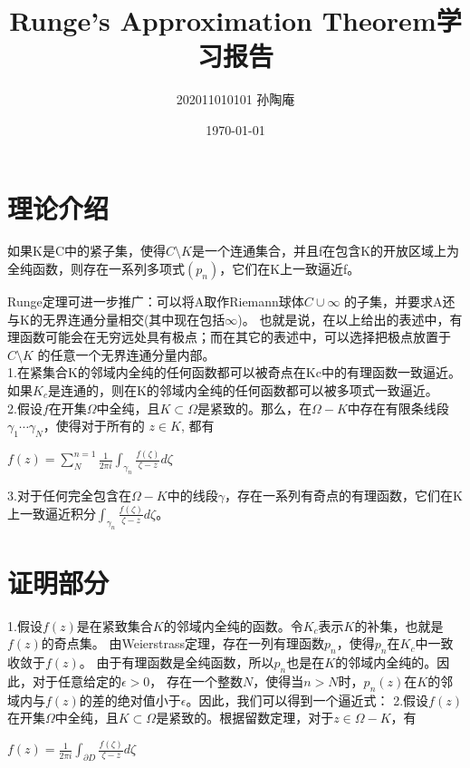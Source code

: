 \documentclass[12pt, a4paper, oneside]{article}
\title{Runge's Approximation Theorem学习报告}
\date{\today}
\author{202011010101 孙陶庵}
\begin{document}
\begin{spacing}{2.0}
\maketitle

\section{理论介绍}
如果K是C中的紧子集，使得$C\setminus K$是一个连通集合，并且f在包含K的开放区域上为全纯函数，则存在一系列多项式$(p_{n})$，它们在K上一致逼近f。

Runge定理可进一步推广：可以将A取作Riemann球体$C\cup{\infty}$ 的子集，并要求A还与K的无界连通分量相交(其中现在包括$\infty$)。
也就是说，在以上给出的表述中，有理函数可能会在无穷远处具有极点；而在其它的表述中，可以选择把极点放置于$C\setminus K$ 的任意一个无界连通分量内部。\\

1.在紧集合K的邻域内全纯的任何函数都可以被奇点在Kc中的有理函数一致逼近。如果$K_c$是连通的，则在K的邻域内全纯的任何函数都可以被多项式一致逼近。\\
2.假设$f$在开集$\Omega$中全纯，且$K \subset  \Omega$是紧致的。那么，在$\Omega - K$中存在有限条线段$\gamma_1\cdots\gamma_N$，使得对于所有的 $z\in K$, 都有

\begin{center}
    $f(z) = \displaystyle\sum_{N}^{n = 1}\frac{1}{2\pi i}\displaystyle\int_{\gamma_n}\frac{f(\zeta)}{\zeta - z}d\zeta$
\end{center}
3.对于任何完全包含在$\Omega-K$中的线段$\gamma$，存在一系列有奇点的有理函数，它们在K上一致逼近积分$\displaystyle\int_{\gamma_n}\frac{f(\zeta)}{\zeta - z}d\zeta$。
\section{证明部分}
1.假设$f(z)$是在紧致集合$K$的邻域内全纯的函数。令$K_c$表示$K$的补集，也就是$f(z)$的奇点集。
由Weierstrass定理，存在一列有理函数${p_n}$，使得$p_n$在$K_c$中一致收敛于$f(z)$。
由于有理函数是全纯函数，所以$p_n$也是在$K$的邻域内全纯的。因此，对于任意给定的$\epsilon > 0$，
存在一个整数$N$，使得当$n > N$时，$p_n(z)$在$K$的邻域内与$f(z)$的差的绝对值小于$\epsilon$。因此，我们可以得到一个逼近式：
2.假设$f(z)$在开集$\Omega$中全纯，且$K \subset \Omega$是紧致的。根据留数定理，对于$z\in \Omega - K$，有

\begin{center}
$f(z) = \displaystyle\frac{1}{2\pi i}\int_{\partial D} \frac{f(\zeta)}{\zeta - z} d\zeta$
\end{center}


\end{spacing}
\end{document}
